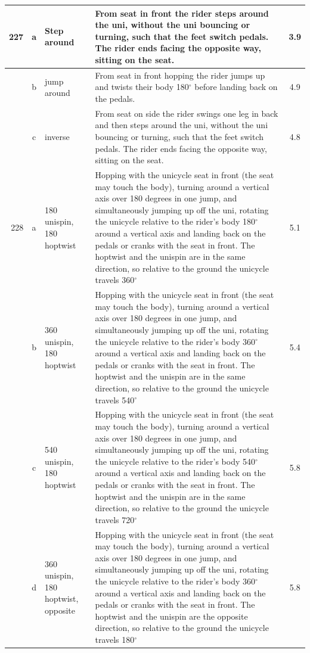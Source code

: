\begin{longtable}{|r|c|p{4cm}|p{8cm}|c|}
\hline
227 & a & Step around & From seat in front the rider steps around the uni, without the uni bouncing or turning, such that the feet switch pedals. The rider ends facing the opposite way, sitting on the seat.  & 3.9 \\ 
\hline
  & b & jump around & From seat in front hopping the rider jumps up and twists their body 180$^\circ$ before landing back on the pedals. & 4.9 \\ 
\hline
  & c & inverse & From seat on side the rider swings one leg in back and then steps around the uni, without the uni bouncing or turning, such that the feet switch pedals. The rider ends facing the opposite way, sitting on the seat. & 4.8 \\ 
\hline
228 & a & 180 unispin, 180 hoptwist & Hopping with the unicycle seat in front (the seat may touch the body), turning around a vertical axis over 180 degrees in one jump, and simultaneously jumping up off the uni, rotating the unicycle relative to the rider’s body 180$^\circ$ around a vertical axis and landing back on the pedals or cranks with the seat in front. The hoptwist and the unispin are in the same direction, so relative to the ground the unicycle travels 360$^\circ$  & 5.1 \\ 
\hline
  & b & 360 unispin, 180 hoptwist & Hopping with the unicycle seat in front (the seat may touch the body), turning around a vertical axis over 180 degrees in one jump, and simultaneously jumping up off the uni, rotating the unicycle relative to the rider’s body 360$^\circ$ around a vertical axis and landing back on the pedals or cranks with the seat in front. The hoptwist and the unispin are in the same direction, so relative to the ground the unicycle travels 540$^\circ$  & 5.4 \\ 
\hline
  & c & 540 unispin, 180 hoptwist & Hopping with the unicycle seat in front (the seat may touch the body), turning around a vertical axis over 180 degrees in one jump, and simultaneously jumping up off the uni, rotating the unicycle relative to the rider’s body 540$^\circ$ around a vertical axis and landing back on the pedals or cranks with the seat in front. The hoptwist and the unispin are in the same direction, so relative to the ground the unicycle travels 720$^\circ$  & 5.8 \\ 
\hline
  & d & 360 unispin, 180 hoptwist, opposite & Hopping with the unicycle seat in front (the seat may touch the body), turning around a vertical axis over 180 degrees in one jump, and simultaneously jumping up off the uni, rotating the unicycle relative to the rider’s body 360$^\circ$ around a vertical axis and landing back on the pedals or cranks with the seat in front. The hoptwist and the unispin are the opposite direction, so relative to the ground the unicycle travels 180$^\circ$ & 5.8 \\ 

\end{longtable}
